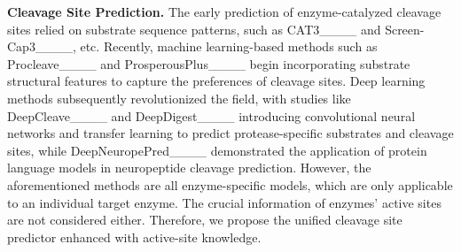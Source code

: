 \textbf{Cleavage Site Prediction.}
The early prediction of enzyme-catalyzed cleavage sites relied on substrate sequence patterns, such as CAT3____ and Screen-Cap3____, etc. Recently, machine learning-based methods such as Procleave____ and ProsperousPlus____ begin incorporating substrate structural features to capture the preferences of cleavage sites. Deep learning methods subsequently revolutionized the field, with studies like DeepCleave____ and DeepDigest____ introducing convolutional neural networks and transfer learning to predict protease-specific substrates and cleavage sites, while DeepNeuropePred____ demonstrated the application of protein language models in neuropeptide cleavage prediction. 
However, the aforementioned methods are all enzyme-specific models, which are only applicable to an individual target enzyme. The crucial information of enzymes' active sites are not considered either. Therefore, we propose the unified cleavage site predictor enhanced with active-site knowledge.




